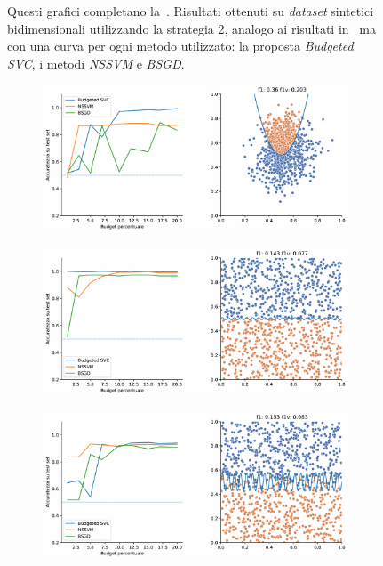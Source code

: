 \begin{appendices}
\begin{figure}
     \caption[Risultati su \emph{dataset} sintetici utilizzando strategia 2 in confronto ad altri metodi.]{Questi grafici completano la~. Risultati ottenuti su \emph{dataset} sintetici bidimensionali utilizzando la strategia 2, analogo ai risultati in~ ma con una curva per ogni metodo utilizzato: la proposta \emph{Budgeted SVC}, i metodi \emph{NSSVM} e \emph{BSGD}.}
\end{figure}
\begin{figure}[ht]\ContinuedFloat
\centering
    \begin{subfigure}{.8\textwidth}
        \centering
        \includegraphics[width=\textwidth]{img/comp_new/5.pdf}
    \end{subfigure}%
    \hfill
    \begin{subfigure}{.8\textwidth}
        \centering
        \includegraphics[width=\textwidth]{img/comp_new/6.pdf}
    \end{subfigure}%
    \hfill
    \begin{subfigure}{.8\textwidth}
        \centering
        \includegraphics[width=\textwidth]{img/comp_new/9.pdf}

\end{subfigure}
\end{figure}
\end{appendices}
